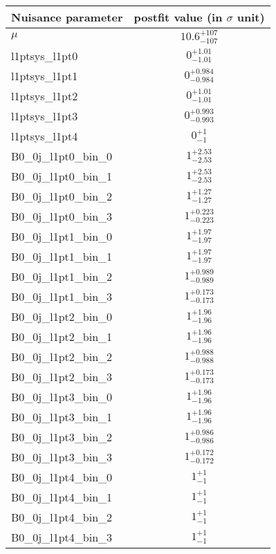
\begin{tabular}{|l|c|}
\hline
Nuisance parameter & postfit value (in $\sigma$ unit) \\\hline
$\mu$ & $10.6^{+107}_{-107}$ \\
l1ptsys\_l1pt0 & $0^{+1.01}_{-1.01}$ \\
l1ptsys\_l1pt1 & $0^{+0.984}_{-0.984}$ \\
l1ptsys\_l1pt2 & $0^{+1.01}_{-1.01}$ \\
l1ptsys\_l1pt3 & $0^{+0.993}_{-0.993}$ \\
l1ptsys\_l1pt4 & $0^{+1}_{-1}$ \\
B0\_0j\_l1pt0\_bin\_0 & $1^{+2.53}_{-2.53}$ \\
B0\_0j\_l1pt0\_bin\_1 & $1^{+2.53}_{-2.53}$ \\
B0\_0j\_l1pt0\_bin\_2 & $1^{+1.27}_{-1.27}$ \\
B0\_0j\_l1pt0\_bin\_3 & $1^{+0.223}_{-0.223}$ \\
B0\_0j\_l1pt1\_bin\_0 & $1^{+1.97}_{-1.97}$ \\
B0\_0j\_l1pt1\_bin\_1 & $1^{+1.97}_{-1.97}$ \\
B0\_0j\_l1pt1\_bin\_2 & $1^{+0.989}_{-0.989}$ \\
B0\_0j\_l1pt1\_bin\_3 & $1^{+0.173}_{-0.173}$ \\
B0\_0j\_l1pt2\_bin\_0 & $1^{+1.96}_{-1.96}$ \\
B0\_0j\_l1pt2\_bin\_1 & $1^{+1.96}_{-1.96}$ \\
B0\_0j\_l1pt2\_bin\_2 & $1^{+0.988}_{-0.988}$ \\
B0\_0j\_l1pt2\_bin\_3 & $1^{+0.173}_{-0.173}$ \\
B0\_0j\_l1pt3\_bin\_0 & $1^{+1.96}_{-1.96}$ \\
B0\_0j\_l1pt3\_bin\_1 & $1^{+1.96}_{-1.96}$ \\
B0\_0j\_l1pt3\_bin\_2 & $1^{+0.986}_{-0.986}$ \\
B0\_0j\_l1pt3\_bin\_3 & $1^{+0.172}_{-0.172}$ \\
B0\_0j\_l1pt4\_bin\_0 & $1^{+1}_{-1}$ \\
B0\_0j\_l1pt4\_bin\_1 & $1^{+1}_{-1}$ \\
B0\_0j\_l1pt4\_bin\_2 & $1^{+1}_{-1}$ \\
B0\_0j\_l1pt4\_bin\_3 & $1^{+1}_{-1}$ \\
\hline
\end{tabular}
